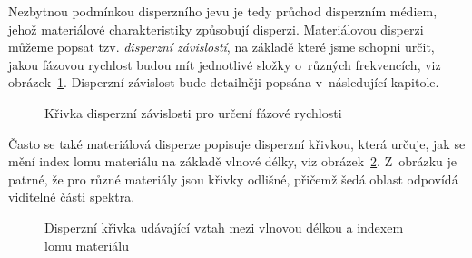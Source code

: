 Nezbytnou podmínkou disperzního jevu je tedy
průchod disperzním médiem, jehož materiálové
charakteristiky způsobují disperzi.
Materiálovou disperzi můžeme popsat tzv.
\textit{disperzní závislostí}, na základě které
jsme schopni určit, jakou fázovou rychlost
budou mít jednotlivé složky o~různých frekvencích,
viz obrázek~\ref{fig:dispersion_rel}. Disperzní
závislost bude detailněji popsána v~následující
kapitole.
\begin{figure}[htbp]
\centering
{}
\caption{Křivka disperzní závislosti
pro určení fázové rychlosti}
\label{fig:dispersion_rel}
\end{figure}

Často se také
materiálová disperze popisuje disperzní
křivkou, která určuje, jak se mění index
lomu materiálu na základě vlnové délky, viz
obrázek~\ref{fig:dispersion_curves}. Z~obrázku
je patrné, že pro různé materiály jsou křivky
odlišné, přičemž šedá oblast odpovídá viditelné
části spektra.
\begin{figure}[htbp]
    \centering
    
    \caption{Disperzní křivka udávající vztah
    mezi vlnovou délkou a indexem lomu materiálu}
    \label{fig:dispersion_curves}
\end{figure}

